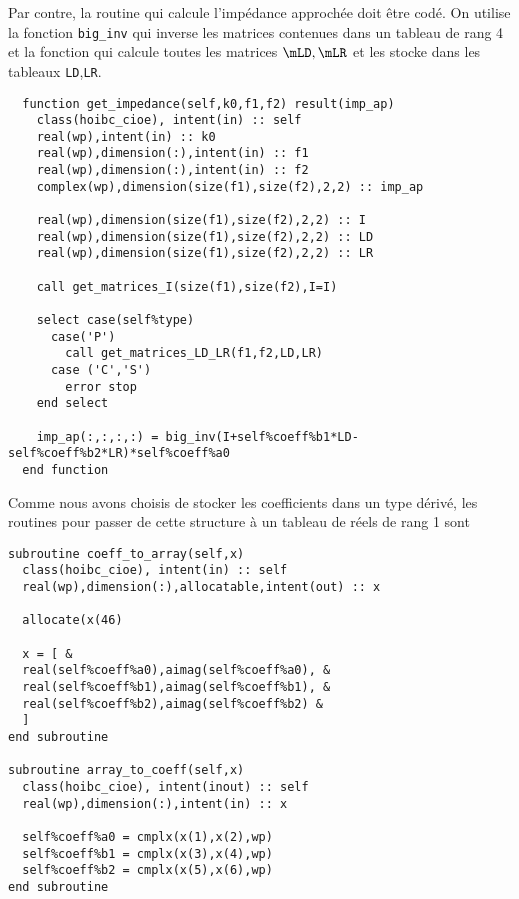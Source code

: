     Par contre, la routine qui calcule l'impédance approchée doit être codé. On utilise la fonction \lstinline{big_inv} qui inverse les matrices contenues dans un tableau de rang 4 et la fonction qui calcule toutes les matrices \(\mLD,\mLR\) et les stocke dans les tableaux \lstinline{LD},\lstinline{LR}.
\begin{lstlisting}
  function get_impedance(self,k0,f1,f2) result(imp_ap)
    class(hoibc_cioe), intent(in) :: self
    real(wp),intent(in) :: k0    
    real(wp),dimension(:),intent(in) :: f1
    real(wp),dimension(:),intent(in) :: f2
    complex(wp),dimension(size(f1),size(f2),2,2) :: imp_ap

    real(wp),dimension(size(f1),size(f2),2,2) :: I
    real(wp),dimension(size(f1),size(f2),2,2) :: LD
    real(wp),dimension(size(f1),size(f2),2,2) :: LR

    call get_matrices_I(size(f1),size(f2),I=I)

    select case(self%type)
      case('P')
        call get_matrices_LD_LR(f1,f2,LD,LR)
      case ('C','S')
        error stop
    end select

    imp_ap(:,:,:,:) = big_inv(I+self%coeff%b1*LD-self%coeff%b2*LR)*self%coeff%a0
  end function
\end{lstlisting}

    Comme nous avons choisis de stocker les coefficients dans un type dérivé, les routines pour passer de cette structure à un tableau de réels de rang 1 sont
\begin{lstlisting}
subroutine coeff_to_array(self,x)
  class(hoibc_cioe), intent(in) :: self
  real(wp),dimension(:),allocatable,intent(out) :: x

  allocate(x(46)

  x = [ &
  real(self%coeff%a0),aimag(self%coeff%a0), &
  real(self%coeff%b1),aimag(self%coeff%b1), &
  real(self%coeff%b2),aimag(self%coeff%b2) &
  ]
end subroutine

subroutine array_to_coeff(self,x)
  class(hoibc_cioe), intent(inout) :: self
  real(wp),dimension(:),intent(in) :: x

  self%coeff%a0 = cmplx(x(1),x(2),wp)
  self%coeff%b1 = cmplx(x(3),x(4),wp)
  self%coeff%b2 = cmplx(x(5),x(6),wp)
end subroutine
\end{lstlisting}


